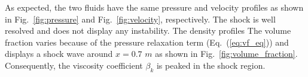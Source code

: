 \documentclass{anstrans}
\newcommand{\eqt}[1]{Eq.~(\ref{#1})}                     %
\newcommand{\fig}[1]{Fig.~\ref{#1}}                      %
\begin{document}
As expected, the two fluids have the same pressure and velocity profiles as shown in \fig{fig:pressure} and \fig{fig:velocity}, respectively. The shock is well resolved and does not display any instability. The density profiles The volume fraction varies because of the pressure relaxation term (\eqt{eq:vf_eq}) and displays a shock wave around $x=0.7$ $m$ as shown in \fig{fig:volume_fraction}. Consequently, the viscosity coefficient $\beta_k$ is peaked in the shock region.
%
\end{document}
